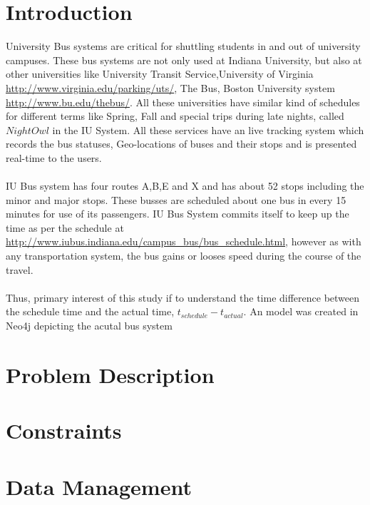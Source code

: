 \documentclass[12pt]{article}
\begin{document}
\clearpage

\tableofcontents
\clearpage

\section{Introduction}
University Bus systems are critical for shuttling students in and out of university campuses. These bus systems are not only used at Indiana University, but also at other universities like University Transit Service,University of Virginia \url{http://www.virginia.edu/parking/uts/}, The Bus, Boston University system \url{http://www.bu.edu/thebus/}. All these universities have similar kind of schedules for different terms like Spring, Fall and special trips during late nights, called $Night Owl$ in the IU System. All these services have an live tracking system which records the bus statuses, Geo-locations of buses and their stops and is presented real-time to the users.\\ \\
IU Bus system has four routes A,B,E and X and has about 52 stops including the minor and major stops. These busses are scheduled about one bus in every 15 minutes for use of its passengers. IU Bus System commits itself to keep up the time as per the schedule at \url{http://www.iubus.indiana.edu/campus_bus/bus_schedule.html}, however as with any transportation system, the bus gains or looses speed during the course of the travel. \\ \\
Thus, primary interest of this study if to understand the time difference between the schedule time and the actual time, $t_{schedule} - t_{actual}$. An model was created in Neo4j depicting the acutal bus system

\clearpage

\section{Problem Description}
\section{Constraints}
\section{Data Management}
\end{document}
